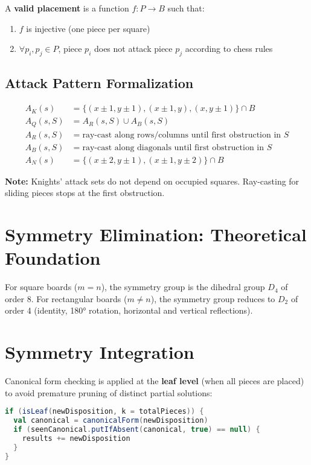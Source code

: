 \documentclass[12pt,a4paper]{article}
\theoremstyle{definition}
\begin{document}
A \textbf{valid placement} is a function $f: P \rightarrow B$ such that:
\begin{enumerate}
\item $f$ is injective (one piece per square)
\item $\forall p_i, p_j \in P$, piece $p_i$ does not attack piece $p_j$ according to chess rules
\end{enumerate}

\subsection{Attack Pattern Formalization}

\begin{align}
A_K(s) &= \{(x \pm 1, y \pm 1), (x \pm 1, y), (x, y \pm 1)\} \cap B \\
A_Q(s, S) &= A_R(s, S) \cup A_B(s, S) \\
A_R(s, S) &= \text{ray-cast along rows/columns until first obstruction in } S \\
A_B(s, S) &= \text{ray-cast along diagonals until first obstruction in } S \\
A_N(s) &= \{(x \pm 2, y \pm 1), (x \pm 1, y \pm 2)\} \cap B
\end{align}

\textbf{Note:} Knights' attack sets do not depend on occupied squares. Ray-casting for sliding pieces stops at the first obstruction.

\section{Symmetry Elimination: Theoretical Foundation}

For square boards ($m = n$), the symmetry group is the dihedral group $D_4$ of order 8. For rectangular boards ($m \neq n$), the symmetry group reduces to $D_2$ of order 4 (identity, 180° rotation, horizontal and vertical reflections).

\section{Symmetry Integration}

Canonical form checking is applied at the \textbf{leaf level} (when all pieces are placed) to avoid premature pruning of distinct partial solutions:

\begin{lstlisting}[language=Scala]
if (isLeaf(newDisposition, k = totalPieces)) {
  val canonical = canonicalForm(newDisposition)
  if (seenCanonical.putIfAbsent(canonical, true) == null) {
    results += newDisposition
  }
}
\end{lstlisting}
\end{document}
